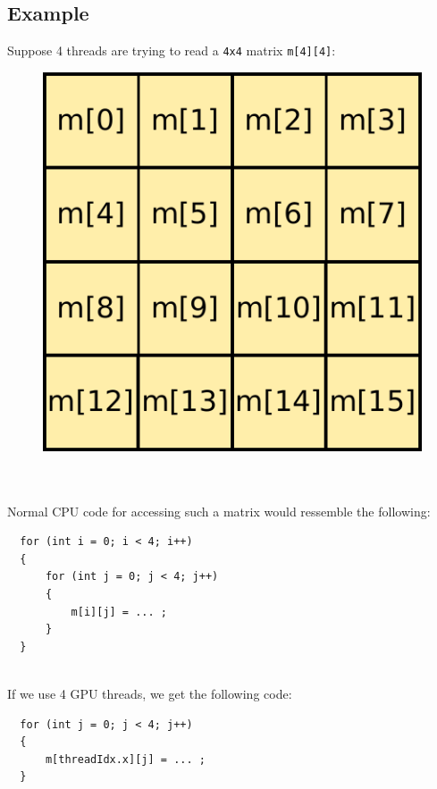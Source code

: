 \documentclass[10pt, a4paper]{report}
\begin{document}
\subsection{Example}
Suppose 4 threads are trying to read a \verb+4x4+ matrix \verb+m[4][4]+:

\begin{figure}[h]
\centering
\includegraphics[scale=0.50]{figs/4x4_matrix}
\label{fig:4x4_matrix}
\end{figure}

\hspace{0pt} \\ \\
Normal CPU code for accessing such a matrix would ressemble the following:
\begin{lstlisting}
  for (int i = 0; i < 4; i++)
  {
      for (int j = 0; j < 4; j++)
      {
          m[i][j] = ... ;
      }
  }
\end{lstlisting}

\hspace{0pt} \\
If we use 4 GPU threads, we get the following code:

\begin{lstlisting}
  for (int j = 0; j < 4; j++)
  {
      m[threadIdx.x][j] = ... ;
  }
\end{lstlisting}
\end{document}
